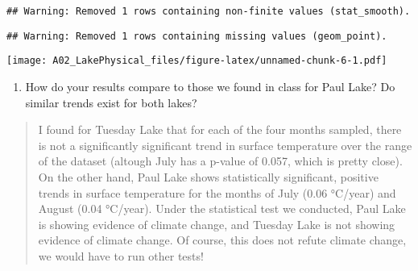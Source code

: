 \documentclass[]{article}
\providecommand{\tightlist}{%
  \setlength{\itemsep}{0pt}\setlength{\parskip}{0pt}}
\begin{document}
\begin{verbatim}
## Warning: Removed 1 rows containing non-finite values (stat_smooth).
\end{verbatim}

\begin{verbatim}
## Warning: Removed 1 rows containing missing values (geom_point).
\end{verbatim}

\texttt{[image: A02\_LakePhysical\_files/figure-latex/unnamed-chunk-6-1.pdf]}

\begin{enumerate}
\def\labelenumi{\arabic{enumi}.}
\setcounter{enumi}{11}
\tightlist
\item
  How do your results compare to those we found in class for Paul Lake?
  Do similar trends exist for both lakes?
\end{enumerate}

\begin{quote}
I found for Tuesday Lake that for each of the four months sampled, there
is not a significantly significant trend in surface temperature over the
range of the dataset (altough July has a p-value of 0.057, which is
pretty close). On the other hand, Paul Lake shows statistically
significant, positive trends in surface temperature for the months of
July (0.06 °C/year) and August (0.04 °C/year). Under the statistical
test we conducted, Paul Lake is showing evidence of climate change, and
Tuesday Lake is not showing evidence of climate change. Of course, this
does not refute climate change, we would have to run other tests!
\end{quote}
\end{document}
